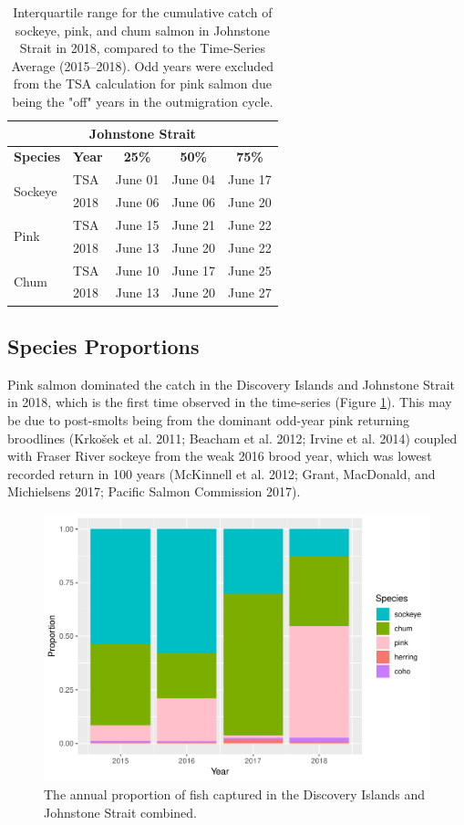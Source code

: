 \documentclass[fleqn,10pt]{wlpeerj} %
\begin{document}
\begin{table}[ht]
\centering
\begin{tabular}{l|l||c|c|c}
\multicolumn{5}{c}{\textbf{Johnstone Strait}} \\
\hline
\textbf{Species} & \textbf{Year} & \textbf{25\%} & \textbf{50\%} & \textbf{75\%} \\
\hline
\multirow{2}{*}{Sockeye} & TSA & June 01 & June 04 & June 17 \\
& 2018 & June 06 & June 06 & June 20 \\
\hline
\multirow{2}{*}{Pink} & TSA & June 15 & June 21 & June 22 \\
& 2018 & June 13 & June 20 & June 22 \\
\hline
\multirow{2}{*}{Chum} & TSA & June 10 & June 17 & June 25 \\
& 2018 & June 13 & June 20 & June 27 \\
\end{tabular}
\caption{\label{tab:mt_js}Interquartile range for the cumulative catch of sockeye, pink, and chum salmon in Johnstone Strait in 2018, compared to the Time-Series Average (2015--2018). Odd years were excluded from the TSA calculation for pink salmon due being the "off" years in the outmigration cycle.}
\end{table}

\subsection*{Species Proportions}\label{species-proportions}

Pink salmon dominated the catch in the Discovery Islands and Johnstone
Strait in 2018, which is the first time observed in the time-series
(Figure \ref{fig:prop}). This may be due to post-smolts being from the
dominant odd-year pink returning broodlines (Krkošek et al. 2011;
Beacham et al. 2012; Irvine et al. 2014) coupled with Fraser River
sockeye from the weak 2016 brood year, which was lowest recorded return
in 100 years (McKinnell et al. 2012; Grant, MacDonald, and Michielsens
2017; Pacific Salmon Commission 2017).

\begin{figure}
\includegraphics[width=0.8\linewidth]{peer_j_migration_dynamics_files/figure-latex/prop-1} \caption{The annual proportion of fish captured in the Discovery Islands and Johnstone Strait combined.}\label{fig:prop}
\end{figure}
\end{document}
